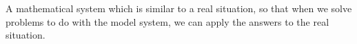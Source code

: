 A mathematical system which is similar to a real 
situation, so that when we solve problems to do with
the model system, we can apply the answers to the real
situation.